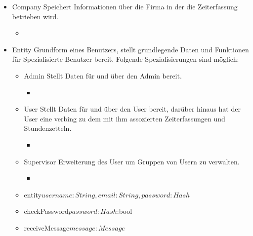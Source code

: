         \begin{itemize}
            \item{Company}
                Speichert Informationen über die Firma in der die Zeiterfassung betrieben wird.
                \begin{itemize}
                    \item{}
                \end{itemize}

            \item{Entity}
                Grundform eines Benutzers, stellt grundlegende Daten und Funktionen für Spezialisierte Benutzer bereit.
                Folgende Spezialisierungen sind möglich:
                \begin{itemize}
                    \item{Admin}
                        Stellt Daten für und über den Admin bereit.
                    \begin{itemize}
                        \item{}
                    \end{itemize}

                    \item{User}
                        Stellt Daten für und über den User bereit, darüber hinaus hat der User eine verbing zu dem mit ihm assozierten Zeiterfassungen und Stundenzetteln.
                        \begin{itemize}
                            \item{}
                        \end{itemize}

                    \item{Supervisor}
                        Erweiterung des User um Gruppen von Usern zu verwalten.
                        \begin{itemize}
                            \item{}
                        \end{itemize}

                \end{itemize}
                \begin{itemize}
                    \item{entity\(username:String , email:String, password:Hash\)}
                    \item{checkPassword\(password:Hash\):bool}
                    \item{receiveMessage\(message:Message\)}
                \end{itemize}


\end{itemize}
